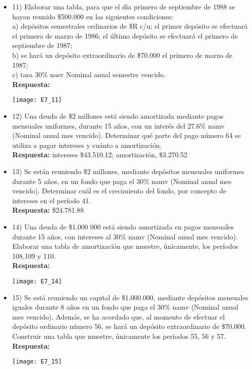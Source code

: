 \begin{itemize}
	\item 11)	 Elaborar una tabla, para que el día primero de septiembre de 1988 se hayan reunido \$500.000 en las siguientes condiciones:\\
	
	a)	depósitos semestrales ordinarios de \$R c/u; el primer depósito se efectuará el primero de marzo de 1986; el último depósito se efectuará el primero de septiembre de 1987; \\
	b)	se hará un depósito extraordinario de \$70.000 el primero de marzo de 1987;\\
	c)	tasa 30\% nasv Nominal anual semestre vencido.\\
	\textbf{Respuesta:}
	\begin{center}
		\texttt{[image: E7\_11]}
	\end{center}
	\medskip
	
	\item 12)	 Una deuda de \$2 millones está siendo amortizada mediante pagos mensuales uniformes, durante 15 años, con un interés del 27.6\% namv (Nominal anual mes vencido). Determinar qué parte del pago número 64 se utiliza a pagar intereses y cuánto a amortización.\\
	\textbf{ Respuesta:} intereses \$43.510.12; amortización, \$3.270.52
	\medskip
	
	\item 13)	 Se están reuniendo \$2 millones, mediante depósitos mensuales uniformes durante 5 años, en un fondo que paga el 30\% namv (Nominal anual mes vencido). Determinar cuál es el crecimiento del fondo, por concepto de intereses en el período 41. \\
	\textbf{Respuesta:} \$24.781.88
	\medskip
	
	\item 14)	 Una deuda de \$1.000 000 está siendo amortizada en pagos mensuales durante 15 años, con intereses al 30\% namv (Nominal anual mes vencido). Elaborar una tabla de amortización que muestre, únicamente, los períodos 108,109 y 110.\\
	\textbf{Respuesta:}
	\begin{center}
		\texttt{[image: E7\_14]}
	\end{center}
	\medskip
	
	\item 15)	 Se está reuniendo un capital de \$1.000.000, mediante depósitos mensuales iguales durante 8 años en un fondo que paga el 30\% namv (Nominal anual mes vencido). Además, se ha acordado que, al momento de efectuar el depósito ordinario número 56, se hará un depósito extraordinario de \$70.000. Construir una tabla que muestre, únicamente los períodos 55, 56 y 57.\\
	\textbf{Respuesta:}
	\begin{center}
		\texttt{[image: E7\_15]}
	\end{center}
	\medskip
	

\end{itemize}
